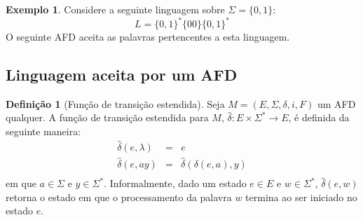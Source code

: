 \documentclass[a4paper]{article}
\theoremstyle{definition}
\newtheorem{Example}{Exemplo}
\newtheorem{Definition}{Definição}
\begin{document}
  \begin{Example}\label{afd00}
    Considere a seguinte linguagem sobre $\Sigma = \{0,1\}$:
    \[
       L = \{0,1\}^*\{00\}\{0,1\}^*
     \]
     O seguinte AFD aceita as palavras pertencentes a esta
     linguagem.

     \begin{figure}[ht]
       \centering      
     \end{figure}
  \end{Example}  
  
  \subsection{Linguagem aceita por um AFD}

  \begin{Definition}[Função de transição estendida]
    Seja $M = (E,\Sigma, \delta, i, F)$ um AFD qualquer. A função de transição
    estendida para $M$, $\widehat{\delta} : E \times \Sigma^* \to E$, é definida
    da seguinte maneira:
    \[
      \begin{array}{lcl}
        \widehat{\delta}(e,\lambda) & = & e \\
        \widehat{\delta}(e,ay)      & = & \widehat{\delta}(\delta(e,a),y) \\
      \end{array}
    \]
    em que $a \in \Sigma$ e $y \in \Sigma^*$. Informalmente, dado um estado $e
    \in E$ e $w \in \Sigma^*$, $\widehat{\delta}(e,w)$ retorna o estado em que o
    processamento da palavra $w$ termina ao ser iniciado no estado $e$.
  \end{Definition}
\end{document}
